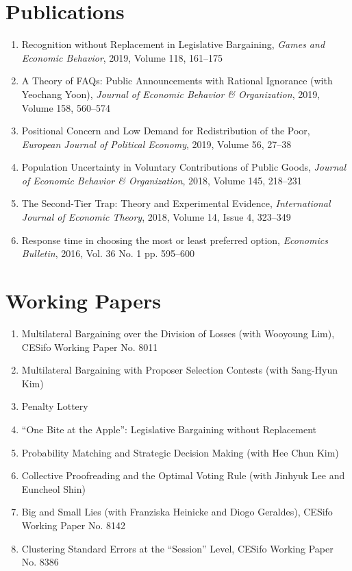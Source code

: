 \documentclass[margin, letterpaper]{res}
\begin{document}
\begin{resume}
\section{Publications}
\begin{enumerate}
\item Recognition without Replacement in Legislative Bargaining, \emph{Games and Economic Behavior}, 2019, Volume 118, 161--175
\item A Theory of FAQs: Public Announcements with Rational Ignorance (with Yeochang Yoon), \emph{Journal of Economic Behavior \& Organization}, 2019, Volume 158, 560--574
\item Positional Concern and Low Demand for Redistribution of the Poor, \emph{European Journal of Political Economy}, 2019, Volume 56, 27--38
\item Population Uncertainty in Voluntary Contributions of Public Goods, \emph{Journal of Economic Behavior \& Organization}, 2018, Volume 145, 218--231
\item The Second-Tier Trap: Theory and Experimental Evidence, \emph{International Journal of Economic Theory}, 2018, Volume 14, Issue 4, 323--349
\item Response time in choosing the most or least preferred option, \textit{Economics Bulletin}, 2016, Vol. 36 No. 1 pp. 595--600
\end{enumerate}

\section{Working Papers}
\begin{enumerate}
\item Multilateral Bargaining over the Division of Losses (with Wooyoung Lim), CESifo Working Paper No. 8011
\item Multilateral Bargaining with Proposer Selection Contests (with Sang-Hyun Kim)
\item Penalty Lottery
\item ``One Bite at the Apple'': Legislative Bargaining without Replacement
\item Probability Matching and Strategic Decision Making (with Hee Chun Kim)
\item Collective Proofreading and the Optimal Voting Rule (with Jinhyuk Lee and Euncheol Shin)
\item Big and Small Lies (with Franziska Heinicke and Diogo Geraldes), CESifo Working Paper No. 8142
\item Clustering Standard Errors at the ``Session'' Level, CESifo Working Paper No. 8386
\end{enumerate}


\end{resume}
\end{document}
